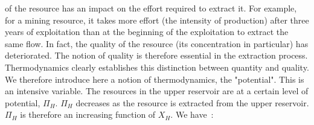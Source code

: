 \documentclass[12pt,a4paper]{article}%
\begin{document}
\begin{appendix}
of the resource has an impact on the effort required to extract it. For example, for a mining resource, it takes more effort (the intensity of production) after three years of exploitation than at the beginning of the exploitation to extract the same flow. In fact, the quality of the resource (its concentration in particular) has deteriorated. The notion of quality is therefore essential in the extraction process. Thermodynamics clearly establishes this distinction between quantity and quality. We therefore introduce here a notion of thermodynamics, the "potential". This is an intensive variable. The resources in the upper reservoir are at a certain level of potential, $\Pi_{H}$. $\Pi_{H}$ decreases as the resource is extracted from the upper reservoir. $\Pi_{H}$ is therefore an increasing function of $X_{H}$.  We have~: %
\end{appendix}
\end{document}
